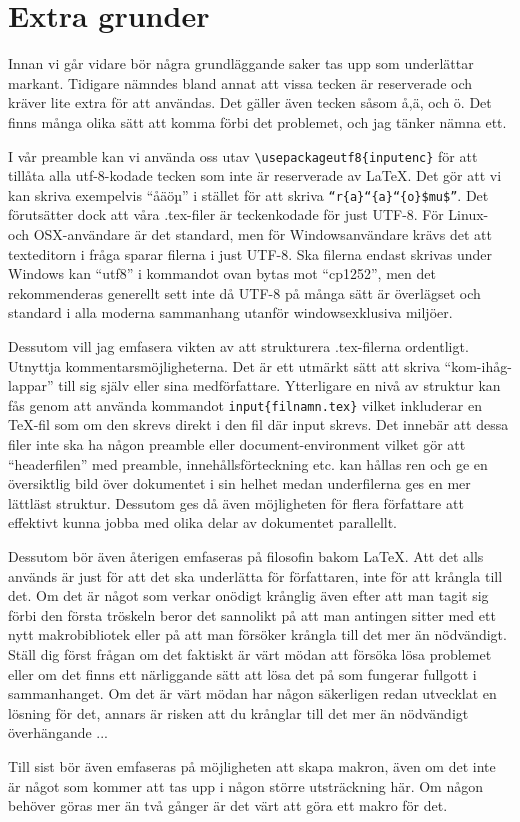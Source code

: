 \section{Extra grunder}
Innan vi går vidare bör några grundläggande saker tas upp som underlättar markant. Tidigare nämndes bland annat att vissa tecken är reserverade och kräver lite extra för att användas. Det gäller även tecken såsom å,ä, och ö. Det finns många olika sätt att komma förbi det problemet, och jag tänker nämna ett.

I vår preamble kan vi använda oss utav \texttt{\textbackslash usepackage\lbrack utf8\rbrack\{inputenc\}} för att tillåta alla utf-8-kodade tecken som inte är reserverade av \LaTeX. Det gör att vi kan skriva exempelvis ``åäöµ'' i stället för att skriva \texttt{``\tb{}r\{a\}\tb{}``\{a\}\tb{}``\{o\}\$\tb{}mu\$''}.
Det förutsätter dock att våra .tex-filer är teckenkodade för just UTF-8. För Linux- och OSX-användare är det standard, men för Windowsanvändare krävs det att texteditorn i fråga sparar filerna i just UTF-8. Ska filerna endast skrivas under Windows kan ``utf8'' i kommandot ovan bytas mot ``cp1252'', men det rekommenderas generellt sett inte då UTF-8 på många sätt är överlägset och standard i alla moderna sammanhang utanför windowsexklusiva miljöer.

Dessutom vill jag emfasera vikten av att strukturera .tex-filerna ordentligt. Utnyttja kommentarsmöjligheterna. Det är ett utmärkt sätt att skriva ``kom-ihåg-lappar'' till sig själv eller sina medförfattare. Ytterligare en nivå av struktur kan fås genom att använda kommandot \texttt{\tb{}input\{filnamn.tex\}} vilket inkluderar en TeX-fil som om den skrevs direkt i den fil där \tb{}input skrevs. Det innebär att dessa filer inte ska ha någon preamble eller document-environment vilket gör att ``headerfilen'' med preamble, innehållsförteckning etc. kan hållas ren och ge en översiktlig bild över dokumentet i sin helhet medan underfilerna ges en mer lättläst struktur. Dessutom ges då även möjligheten för flera författare att effektivt kunna jobba med olika delar av dokumentet parallellt.

Dessutom bör även återigen emfaseras på filosofin bakom \LaTeX. Att det alls används är just för att det ska underlätta för författaren, inte för att krångla till det. Om det är något som verkar onödigt krånglig även efter att man tagit sig förbi den första tröskeln beror det sannolikt på att man antingen sitter med ett nytt makrobibliotek eller på att man försöker krångla till det mer än nödvändigt. Ställ dig först frågan om det faktiskt är värt mödan att försöka lösa problemet eller om det finns ett närliggande sätt att lösa det på som fungerar fullgott i sammanhanget. Om det är värt mödan har någon säkerligen redan utvecklat en lösning för det, annars är risken att du krånglar till det mer än nödvändigt överhängande ...

Till sist bör även emfaseras på möjligheten att skapa makron, även om det inte är något som kommer att tas upp i någon större utsträckning här. Om någon behöver göras mer än två gånger är det värt att göra ett makro för det. 
